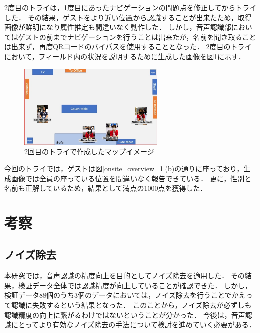 \documentclass[a4j]{jarticle}
\begin{document}
2度目のトライは，1度目にあったナビゲーションの問題点を修正してからトライした．
その結果，ゲストをより近い位置から認識することが出来たため，取得画像が鮮明になり属性推定も間違いなく動作した．
しかし，音声認識部においてはゲストの前までナビゲーションを行うことは出来たが，名前を聞き取ることは出来ず，再度QRコードのバイパスを使用することとなった．
2度目のトライにおいて，フィールド内の状況を説明するために生成した画像を図\ref{result_FMM_2}に示す．
\begin{figure}[t]
  \centering
  \includegraphics[width=7cm]{images/FMM/mapimage.png}
  \caption{2回目のトライで作成したマップイメージ}
  \label{result_FMM_2}
\end{figure}
今回のトライでは，ゲストは図\ref{onsite_overview_1}(b)の通りに座っており，生成画像では全員の座っている位置を間違いなく報告できている．
更に，性別と名前も正解しているため，結果として満点の1000点を獲得した．


\section{考察}

\subsection{ノイズ除去}
本研究では，音声認識の精度向上を目的としてノイズ除去を適用した．
その結果，検証データ全体では認識精度が向上していることが確認できた．
しかし，検証データ88個のうち3個のデータにおいては，ノイズ除去を行うことでかえって認識に失敗するという結果となった．
このことから，ノイズ除去が必ずしも認識精度の向上に繋がるわけではないということが分かった．
今後は，音声認識にとってより有効なノイズ除去の手法について検討を進めていく必要がある．
\end{document}

